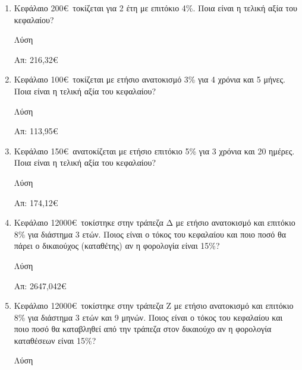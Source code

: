 \documentclass[a4paper,12pt]{article}
\begin{document}
\begin{center}
\end{center}

\vspace{1cm}

\begin{enumerate}
\item Κεφάλαιο 200\euro\ τοκίζεται για 2 έτη με επιτόκιο 4\%. Ποια είναι η τελική αξία του κεφαλαίου?

\hspace{.15\textwidth}Λύση

\vspace{3cm}\hfill Απ: 216,32\euro

\item Κεφάλαιο 100\euro\ τοκίζεται με ετήσιο ανατοκισμό 3\% για 4 χρόνια και 5 μήνες. Ποια είναι η τελική αξία του κεφαλαίου?

\hspace{.15\textwidth}Λύση

\vspace{3cm}\hfill Απ: 113,95\euro

\item Κεφάλαιο 150\euro\ ανατοκίζεται με ετήσιο επιτόκιο 5\% για 3 χρόνια και 20 ημέρες. Ποια είναι η τελική αξία του κεφαλαίου?

\hspace{.15\textwidth}Λύση

\vspace{3cm}\hfill Απ: 174,12\euro

\item Κεφάλαιο 12000\euro\ τοκίστηκε στην τράπεζα Δ με ετήσιο ανατοκισμό και επιτόκιο 8\% για διάστημα 3 ετών. Ποιος είναι ο τόκος του κεφαλαίου και ποιο ποσό θα πάρει ο δικαιούχος (καταθέτης) αν η φορολογία είναι 15\%? 

\hspace{.15\textwidth}Λύση

\vspace{3cm}\hfill Απ: 2647,042\euro

\newpage

\item Κεφάλαιο 12000\euro\ τοκίστηκε στην τράπεζα Ζ με ετήσιο ανατοκισμό και επιτόκιο 8\% για διάστημα 3 ετών και 9 μηνών. Ποιος είναι ο τόκος του κεφαλαίου και ποιο ποσό θα καταβληθεί από την τράπεζα στον δικαιούχο αν η φορολογία καταθέσεων είναι 15\%?

\hspace{.15\textwidth}Λύση


\end{enumerate}
\end{document}
